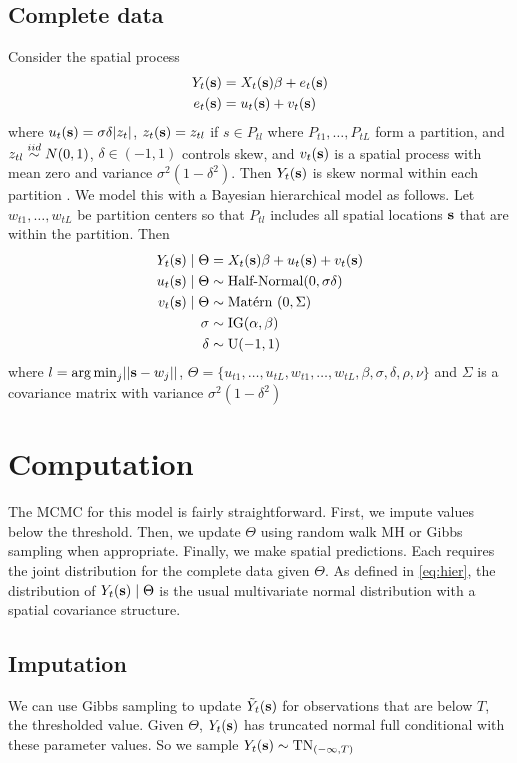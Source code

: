 \documentclass[11pt]{article}
\begin{document}
\subsection{Complete data}\label{s:model}
Consider the spatial process
\begin{align} \label{eq:fullmodel}
  Y_t(\mbox{\bf s}) &= X_t(\mbox{\bf s}) \beta + e_t(\mbox{\bf s})\\
  e_t(\mbox{\bf s}) &= u_t(\mbox{\bf s}) + v_t(\mbox{\bf s})
\end{align}
where $u_t(\mbox{\bf s}) = \sigma \delta |z_t|$, $z_t(\mbox{\bf s}) = z_{tl}$ if $s \in P_{tl}$ where $P_{t1}, \ldots, P_{tL}$ form a partition, and $z_{tl} \stackrel{iid}{\sim} N(0, 1)$, $\delta \in (-1, 1)$ controls skew, and $v_t(\mbox{\bf s})$ is a spatial process with mean zero and variance $\sigma^2(1 - \delta^2)$.
Then $Y_t(\mbox{\bf s})$ is skew normal within each partition \citep{Minozzo2012}.
We model this with a Bayesian hierarchical model as follows.
Let $w_{t1}, \ldots, w_{tL}$ be partition centers so that $P_{tl}$ includes all spatial locations $\mbox{\bf s}$ that are within the partition.
Then
\begin{align} \label{eq:hier}
    Y_t(\mbox{\bf s}) \mid \Theta &= X_t(\mbox{\bf s}) \beta + u_t(\mbox{\bf s}) + v_t(\mbox{\bf s}) \\
    u_t(\mbox{\bf s}) \mid \Theta &\sim \mbox{Half-Normal}(0, \sigma \delta)\\
    v_t(\mbox{\bf s}) \mid \Theta & \sim \mbox{Mat$\acute{\mbox{e}}$rn }(0, \Sigma)\\
    \sigma &\sim \mbox{IG}(\alpha, \beta)\\
    \delta &\sim \mbox{U}(-1, 1)
\end{align}
where $l = {\mathop{\rm arg\, min}}_j ||\mbox{\bf s} - w_j ||$, $\Theta = \{u_{t1}, \ldots, u_{tL}, w_{t1}, \ldots, w_{tL}, \beta, \sigma, \delta, \rho, \nu \}$ and $\Sigma$ is a \Matern covariance matrix with variance $\sigma^2 (1 - \delta^2)$ 



\section{Computation}\label{s:comp}
The MCMC for this model is fairly straightforward.
First, we impute values below the threshold.
Then, we update $\Theta$ using random walk MH or Gibbs sampling when appropriate.
Finally, we make spatial predictions.
Each requires the joint distribution for the complete data given $\Theta$.
As defined in \ref{eq:hier}, the distribution of $Y_t(\mbox{\bf s}) \mid \Theta$ is the usual multivariate normal distribution with a \Matern spatial covariance structure.

\subsection{Imputation}\label{s:impute}
We can use Gibbs sampling to update ${\tilde Y}_t(\mbox{\bf s})$ for observations that are below $T$, the thresholded value. Given $\Theta$, $Y_t(\mbox{\bf s})$ has truncated normal full conditional with these parameter values.
So we sample $Y_t(\mbox{\bf s}) \sim \text{TN}_{(-\infty, T)}$
\end{document}
